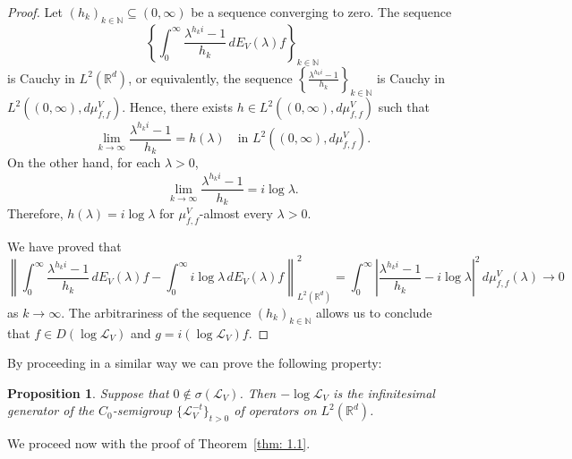\documentclass[10pt, a4paper, reqno]{amsart}
\newtheorem{prop}[thm]{Proposition}
\theoremstyle{definition}
\theoremstyle{remark}
\numberwithin{equation}{section}
\begin{document}
\begin{proof}
    Let $(h_k)_{k \in \mathbb{N}} \subseteq (0,\infty)$ be a sequence converging to zero. The sequence
    \[
    \left\{ \int_0^\infty \frac{\lambda^{h_k i} - 1}{h_k} \, dE_V(\lambda) f \right\}_{k \in \mathbb{N}}
    \]
    is Cauchy in $L^2(\mathbb{R}^d)$, or equivalently, the sequence $\displaystyle \left\{ \frac{\lambda^{h_k i}-1}{h_k}\right\}_{k \in \mathbb{N}}$ is Cauchy in $L^2((0,\infty), d\mu_{f,f}^V)$. Hence, there exists $h \in L^2((0,\infty), d\mu_{f,f}^V)$ such that
    \[
    \lim_{k \rightarrow \infty} \frac{\lambda^{h_k i}-1}{h_k} = h(\lambda) \quad \text{in } L^2((0,\infty), d\mu_{f,f}^V).
    \]
    On the other hand, for each $\lambda > 0$,
    \[
    \lim_{k \rightarrow \infty} \frac{\lambda^{h_k i}-1}{h_k} = i\log\lambda.
    \]
    Therefore, $h(\lambda) = i\log\lambda$ for $\mu_{f,f}^V$-almost every $\lambda > 0$.

    We have proved that 
    \[ 
    \left\| \int_0^\infty \frac{\lambda^{h_k i}-1}{h_k} \, dE_V(\lambda) f - \int_0^\infty i\log\lambda \, dE_V(\lambda) f \right\|_{L^2(\mathbb{R}^d)}^2 = 
    \int_0^\infty \left| \frac{\lambda^{h_k i}-1}{h_k} - i\log\lambda \right|^2 \, d\mu_{f,f}^V(\lambda) \rightarrow 0
    \]
    as $k \rightarrow \infty$. The arbitrariness of the sequence $(h_k)_{k \in \mathbb{N}}$ allows us to conclude that $f \in D(\log \mathcal{L}_V)$ and $g = i(\log \mathcal{L}_V) f$.
\end{proof}

By proceeding in a similar way we can prove the following property:

\begin{prop}\label{propo: 2.3}
    Suppose that $0 \notin \sigma(\mathcal{L}_V)$. Then $-\log \mathcal{L}_V$ is the infinitesimal generator of the $C_0$-semigroup $\{\mathcal{L}_V^{-t}\}_{t>0}$ of operators on $L^2(\mathbb{R}^d)$.
\end{prop}

We proceed now with the proof of Theorem~\ref{thm: 1.1}.
\end{document}
